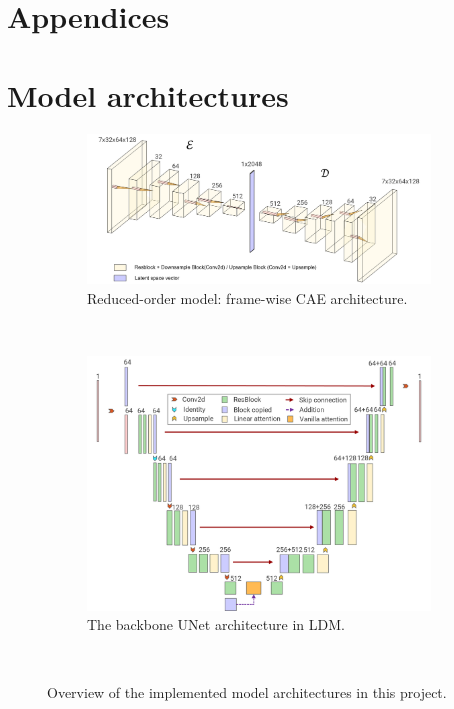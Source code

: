 \documentclass[final-report]{article-template}
\begin{document}
\newpage


\clearpage
\section*{Appendices}
\appendix
\section{Model architectures}
\begin{figure}[htbp]
    \renewcommand{\figurename}{Figure}
    \renewcommand{\thefigure}{A1}
    \centering
    \begin{subfigure}[t]{0.9\textwidth}
        \centering
        \includegraphics[width=\textwidth]{figures/model_cae.png}
        \caption{Reduced-order model: frame-wise CAE architecture.}
        \label{fig:cae}
    \end{subfigure} \\[11mm]
    \begin{subfigure}[t]{0.75\textwidth}
        \centering
        \includegraphics[width=\textwidth]{figures/model_unet.png}
        \caption{The backbone UNet architecture in LDM.}
        \label{fig:unet}
    \end{subfigure} \\[5mm]
    \caption{Overview of the implemented model architectures in this project.}
\end{figure}
\clearpage
\end{document}

